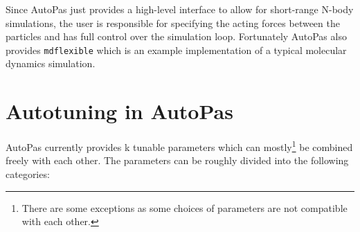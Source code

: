 Since AutoPas just provides a high-level interface to allow for short-range N-body simulations, the user is responsible for specifying the acting forces between the particles and has full control over the simulation loop. Fortunately AutoPas also provides \texttt{\gls{mdflexible}} which is an example implementation of a typical molecular dynamics simulation.

\section{Autotuning in AutoPas}

AutoPas currently provides k  tunable parameters which can mostly\footnote{There are some exceptions as some choices of parameters are not compatible with each other.} be combined freely with each other. The parameters can be roughly divided into the following categories:


